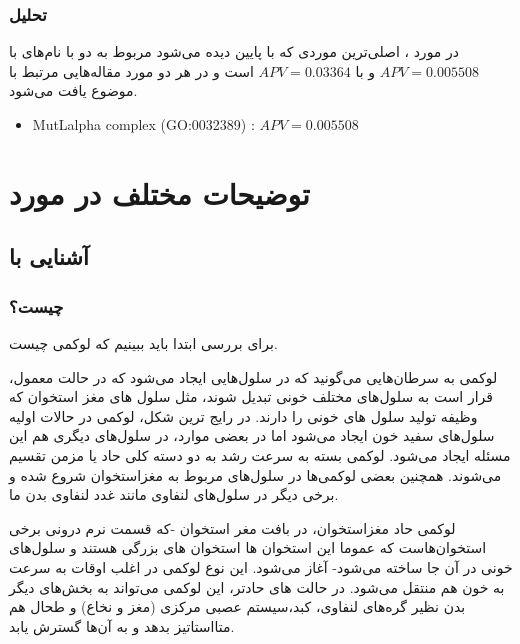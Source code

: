 \documentclass[12pt]{article}
\begin{document}
\newpage

\subsubsection{تحلیل}

در مورد  ، اصلی‌ترین موردی که با  پایین دیده می‌شود مربوط به دو  با نام‌های 	 با
$APV = 0.005508$
 و 
با $APV=0.03364$ است و در هر دو مورد مقاله‌هایی مرتبط با موضوع یافت می‌شود. \cite{carcin,methylation}

\begin{latin}
	\begin{itemize}
		\item  {MutLalpha complex (GO:0032389)} : $APV = 0.005508$
	\end{itemize}
\end{latin}




\section{توضیحات مختلف در مورد }

\subsection{آشنایی با }

\subsubsection{ چیست؟}
برای بررسی  ابتدا باید ببینیم که لوکمی چیست.

لوکمی  به سرطان‌هایی می‌گونید که در سلول‌هایی ایجاد می‌شود که در حالت معمول، قرار است به سلول‌های مختلف خونی تبدیل شوند، مثل سلول های مغز استخوان که وظیفه تولید سلول های خونی را دارند. در رایج ترین شکل، لوکمی در حالات اولیه سلول‌های سفید خون ایجاد می‌شود اما در بعضی موارد، در سلول‌های دیگری هم این مسئله ایجاد می‌شود. لوکمی بسته به سرعت رشد به دو دسته  کلی حاد  یا مزمن 
تقسیم می‌شوند. همچنین بعضی لوکمی‌ها در سلول‌های مربوط به مغزاستخوان
شروع شده و برخی دیگر در سلول‌های لنفاوی
مانند غدد لنفاوی بدن ما.


لوکمی حاد مغزاستخوان، در بافت مغر استخوان -که قسمت نرم درونی برخی استخوان‌هاست که عموما این استخوان ها استخوان های بزرگی هستند و سلول‌های خونی در آن جا ساخته می‌شود- آغاز می‌شود. این نوع لوکمی در اغلب اوقات به سرعت به خون هم منتقل می‌شود. در حالت های حادتر، این لوکمی می‌تواند به بخش‌های دیگر بدن نظیر گره‌های لنفاوی، کبد،‌سیستم عصبی مرکزی (مغز و نخاع) و طحال هم متااستاتیز 
بدهد و به آن‌ها گسترش یابد.
\end{document}
